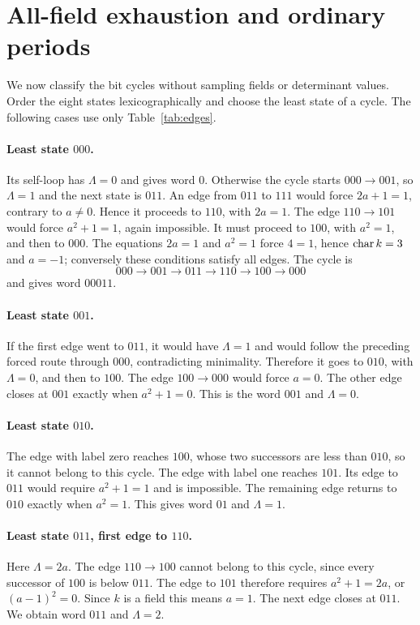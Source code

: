 \section{All-field exhaustion and ordinary periods}\label{sec:exhaustion}
We now classify the bit cycles without sampling fields or determinant
values. Order the eight states lexicographically and choose the least
state of a cycle. The following cases use only Table~\ref{tab:edges}.

\paragraph{Least state $000$.}
Its self-loop has $\Lambda=0$ and gives word $0$. Otherwise the
cycle starts $000\to001$, so $\Lambda=1$ and the next state is
$011$. An edge from $011$ to $111$ would force $2a+1=1$,
contrary to $a\ne0$. Hence it proceeds to $110$, with $2a=1$.
The edge $110\to101$ would force $a^2+1=1$, again impossible.
It must proceed to $100$, with $a^2=1$, and then to $000$.
The equations $2a=1$ and $a^2=1$ force $4=1$, hence
$\operatorname{char} k=3$ and $a=-1$; conversely these conditions satisfy all
edges. The cycle is
\[
 000\to001\to011\to110\to100\to000
\]
and gives word $00011$.

\paragraph{Least state $001$.}
If the first edge went to $011$, it would have $\Lambda=1$ and
would follow the preceding forced route through $000$, contradicting
minimality. Therefore it goes to $010$, with $\Lambda=0$, and
then to $100$. The edge $100\to000$ would force $a=0$.
The other edge closes at $001$ exactly when $a^2+1=0$.
This is the word $001$ and $\Lambda=0$.

\paragraph{Least state $010$.}
The edge with label zero reaches $100$, whose two successors
are less than $010$, so it cannot belong to this cycle. The edge
with label one reaches $101$. Its edge to $011$ would require
$a^2+1=1$ and is impossible. The remaining edge returns to
$010$ exactly when $a^2=1$. This gives word $01$ and
$\Lambda=1$.

\paragraph{Least state $011$, first edge to $110$.}
Here $\Lambda=2a$. The edge $110\to100$ cannot belong to this
cycle, since every successor of $100$ is below $011$.
The edge to $101$ therefore requires $a^2+1=2a$, or
$(a-1)^2=0$. Since $k$ is a field this means $a=1$.
The next edge closes at $011$. We obtain word $011$ and
$\Lambda=2$.


